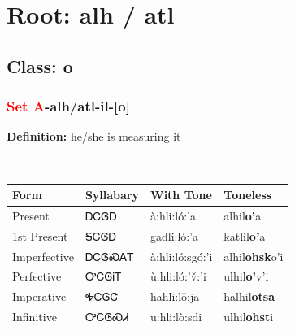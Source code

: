 \needspace{4in}
\section*{Root: alh / atl}
\nopagebreak
{}
\needspace{3in}
\subsection*{Class: o}
\nopagebreak
\needspace{2in}
\subsubsection*{\textcolor{Red}{Set A}{-}\textbf{alh/atl}{-}il{-}[o]}
\nopagebreak
\textbf{Definition: } he/she is measuring it
\\[0.5em]
\begin{tabularx}{\textwidth}{l X X X}%
\toprule%
\textbf{Form}&\textbf{Syllabary}&\textbf{With Tone}&\textbf{Toneless}\\%
\midrule%
Present&ᎠᏟᎶᎠ&à:hli:ló:’a&alhil\textbf{o'}a\\%
1st Present&ᎦᏟᎶᎠ&gadli:ló:’a&katlil\textbf{o'}a\\%
Imperfective&ᎠᏟᎶᏍᎪᎢ&à:hli:ló:sgó:’i&alhil\textbf{ohsk}o'i\\%
Perfective&ᎤᏟᎶᎥᎢ&ù:hli:ló:’v̌:’i&ulhil\textbf{o'}v'i\\%
Imperative&ᎭᏟᎶᏣ&hahli:lǒ:ja&halhil\textbf{otsa}\\%
Infinitive&ᎤᏟᎶᏍᏗ&u:hli:lò:sdi&ulhil\textbf{ohst}i\\%
\bottomrule%
\end{tabularx}
\\[1em]